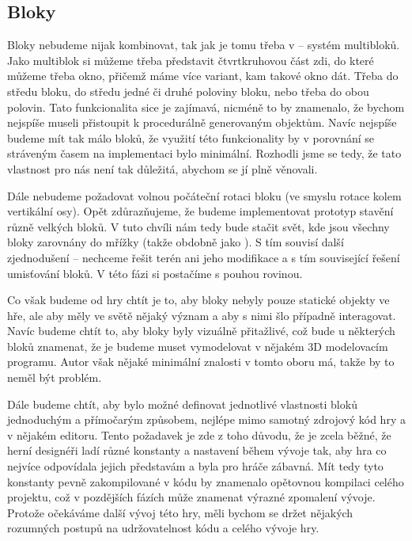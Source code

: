 
\subsection{Bloky}

 Bloky nebudeme nijak kombinovat, tak jak je tomu třeba v \ME{} -- systém multibloků. Jako multiblok si můžeme třeba představit čtvrtkruhovou část zdi, do které můžeme  třeba okno, přičemž máme více variant, kam takové okno dát. Třeba do středu bloku, do středu jedné či druhé poloviny bloku, nebo třeba do obou polovin. Tato funkcionalita sice je zajímavá, nicméně to by znamenalo, že bychom nejspíše museli přistoupit k procedurálně generovaným objektům. Navíc nejspíše budeme mít tak málo bloků, že využití této funkcionality by v porovnání se stráveným časem na implementaci bylo minimální. Rozhodli jsme se tedy, že tato vlastnost pro nás není tak důležitá, abychom se jí plně věnovali. 

Dále nebudeme požadovat volnou počáteční rotaci bloku (ve smyslu rotace kolem vertikální osy). Opět zdůrazňujeme, že budeme implementovat prototyp stavění různě velkých bloků. V tuto chvíli nám tedy bude stačit svět, kde jsou všechny bloky zarovnány do mřížky (takže obdobně jako \MC{}). S tím souvisí další zjednodušení -- nechceme řešit terén ani jeho modifikace a s tím související řešení umisťování bloků. V této fázi si postačíme s pouhou rovinou.

Co však budeme od hry chtít je to, aby bloky nebyly pouze statické objekty ve hře, ale aby měly ve světě nějaký význam a aby s nimi šlo případně interagovat. Navíc budeme chtít to, aby bloky byly vizuálně přitažlivé, což bude u některých bloků znamenat, že je budeme muset vymodelovat v nějakém 3D modelovacím programu. Autor však nějaké minimální znalosti v tomto oboru má, takže by to neměl být problém.

Dále budeme chtít, aby bylo možné definovat jednotlivé vlastnosti bloků jednoduchým a přímočarým způsobem, nejlépe mimo samotný zdrojový kód hry a v nějakém editoru. Tento požadavek je zde z toho důvodu, že je zcela běžné, že herní designéři ladí různé konstanty a nastavení během vývoje tak, aby hra co nejvíce odpovídala jejich představám a byla pro hráče zábavná. Mít tedy tyto konstanty pevně zakompilované v kódu by znamenalo opětovnou kompilaci celého projektu, což v pozdějších fázích může znamenat výrazné zpomalení vývoje. Protože očekáváme další vývoj této hry, měli bychom se držet nějakých rozumných postupů na udržovatelnost kódu a celého vývoje hry.




